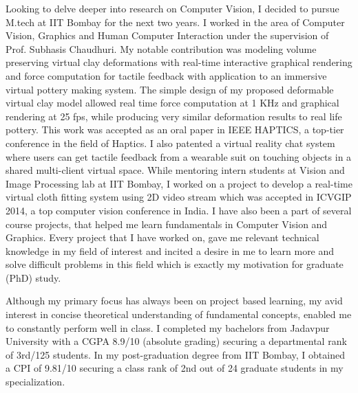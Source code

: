 \documentclass{article}
\begin{document}
	\vspace{0.2cm}
	
	Looking to delve deeper into research on Computer Vision, I decided to pursue M.tech at IIT Bombay for the next two years. I worked in the area of Computer Vision, Graphics and Human Computer Interaction under the supervision of Prof. Subhasis Chaudhuri. My notable contribution was modeling volume preserving virtual clay deformations with real-time interactive graphical rendering and force computation for tactile feedback with application to an immersive virtual pottery making system. The simple design of my proposed deformable virtual clay model allowed real time force computation at 1 KHz and graphical rendering at 25 fps, while producing very similar deformation results to real life pottery. This work was accepted as an oral paper in IEEE HAPTICS, a top-tier conference in the field of Haptics. I also patented a virtual reality chat system where users can get tactile feedback from a wearable suit on touching objects in a shared multi-client virtual space. While mentoring intern students at Vision and Image Processing lab at IIT Bombay, I worked on a project to develop a real-time virtual cloth fitting system using 2D video stream which was accepted in ICVGIP 2014, a top computer vision conference in India. I have also been a part of several course projects, that helped me learn fundamentals in Computer Vision and Graphics. Every project that I have worked on, gave me relevant technical knowledge in my field of interest and incited a desire in me to learn more and solve difficult problems in this field which is exactly my motivation for graduate (PhD) study.

	\vspace{0.2cm}

	Although my primary focus has always been on project based learning, my avid interest in concise theoretical understanding of fundamental concepts, enabled me to constantly perform well in class. I completed my bachelors from Jadavpur University with a CGPA 8.9/10 (absolute grading) securing a departmental rank of 3rd/125 students. In my post-graduation degree from IIT Bombay, I obtained a CPI of 9.81/10 securing a class rank of 2nd out of 24 graduate students in my specialization.
	
	\vspace{0.2cm}
	
\end{document}
